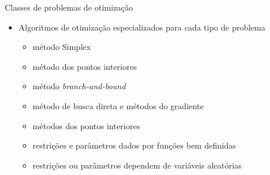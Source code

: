 \begin{frame}{Classes de problemas de otimização}
  \begin{itemize}
    \item Algoritmos de otimização  especializados para cada tipo de problema
    \begin{itemize}\addtolength{\itemsep}{0.5\baselineskip}
      \item {}  método Simplex
      \item {}  método dos pontos interiores
      \item {}  método \textit{branch-and-bound}
      \item {}  método de busca direta e métodos do gradiente
      \item {}  métodos dos pontos interiores
      \item {}  restrições e parâmetros dados por funções bem definidas
      \item {}  restrições ou parâmetros dependem de variáveis aleatórias
    \end{itemize}
  \end{itemize}
\end{frame}

